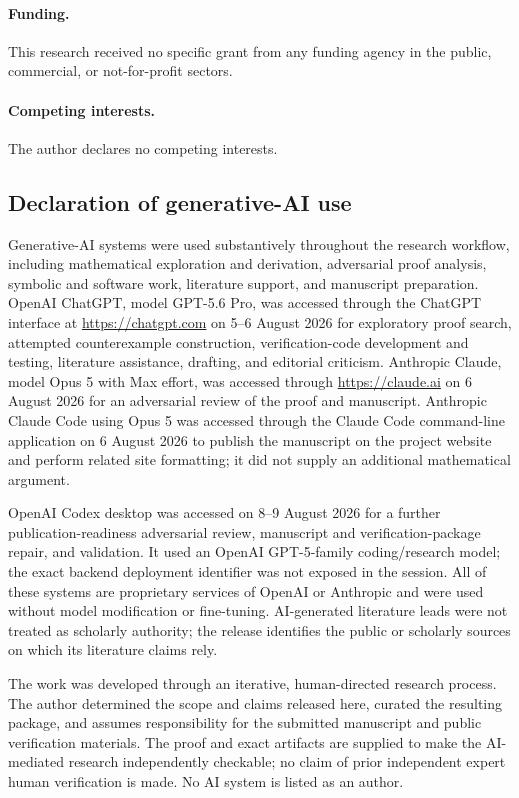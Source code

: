 \paragraph{Funding.}
This research received no specific grant from any funding agency in the public,
commercial, or not-for-profit sectors.

\paragraph{Competing interests.}
The author declares no competing interests.

\subsection*{Declaration of generative-AI use}
Generative-AI systems were used substantively throughout the research
workflow, including mathematical exploration and derivation, adversarial
proof analysis, symbolic and software work, literature support, and
manuscript preparation.  OpenAI ChatGPT, model GPT-5.6 Pro, was accessed
through the ChatGPT interface at \url{https://chatgpt.com} on 5--6 August 2026
for exploratory proof search, attempted counterexample construction,
verification-code development and testing, literature assistance, drafting,
and editorial criticism.  Anthropic Claude, model Opus 5 with Max effort, was
accessed through \url{https://claude.ai} on 6 August 2026 for an adversarial
review of the proof and manuscript.  Anthropic Claude Code using Opus 5 was
accessed through the Claude Code command-line application on 6 August 2026 to
publish the manuscript on the project website and perform related site
formatting; it did not supply an additional mathematical argument.

OpenAI Codex desktop was accessed on 8--9 August 2026 for a further
publication-readiness adversarial review, manuscript and verification-package
repair, and validation.  It used an OpenAI GPT-5-family coding/research model;
the exact backend deployment identifier was not exposed in the session.  All
of these systems are proprietary services of OpenAI or Anthropic and were used
without model modification or fine-tuning.  AI-generated literature leads
were not treated as scholarly authority; the release identifies the public or
scholarly sources on which its literature claims rely.

The work was developed through an iterative, human-directed research process.
The author determined the scope and claims released here, curated the
resulting package, and assumes responsibility for the submitted manuscript and
public verification materials.  The proof and exact artifacts are supplied to
make the AI-mediated research independently checkable; no claim of prior
independent expert human verification is made.  No AI system is listed as an
author.

